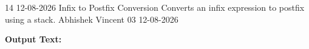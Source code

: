\clearpage
\label{prog:14}
\programhead
  {14}
  {12-08-2026}
  {Infix to Postfix Conversion}
  {Converts an infix expression to postfix using a stack.}
  {Abhishek Vincent}
  {03}
  {12-08-2026}

\divider
\textbf{Output Text:}\par
\vspace{2pt}

